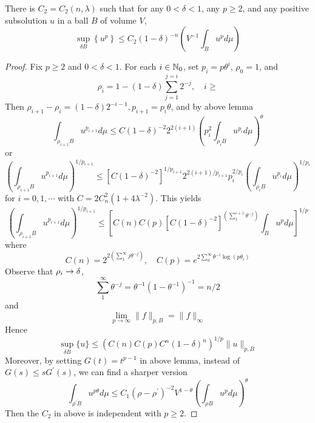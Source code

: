 \begin{enumerate}[label=\Roman*.]
	\begin{thm}
		There is $C_2 = C_2(n,\lambda)$ such that for any $0 < \delta < 1$, any $p \geq 2$, and any positive subsolution $u$ in a ball $B$ of volume $V$,
		\begin{equation*}
			\sup _{\delta B}\left\{u^p\right\} \leq C_2(1-\delta)^{-n}\left(V^{-1} \int_B u^p d \mu\right)
		\end{equation*}
	\end{thm}
	\begin{proof}
		Fix $p \geq 2$ and $0 < \delta < 1$. For each $i \in \mathbb{N}_0$, set $p_i = p\theta^i$, $\rho_0 = 1$, and
		\begin{equation*}
			\rho_i=1-(1-\delta) \sum_{j=1}^{j=i} 2^{-j}, \quad i \geq
		\end{equation*}
		Then $\rho_{i+1}-\rho_i=(1-\delta) 2^{-i-1}, p_{i+1}=p_i \theta$, and by above lemma
		\begin{equation*}
			\int_{\rho_{i+1} B} u^{p_{i+1}} d \mu \leq C(1-\delta)^{-2} 2^{2(i+1)}\left(p_i^2 \int_{\rho_i B} u^{p_i} d \mu\right)^\theta
		\end{equation*}
		or
		\begin{equation*}
			\left(\int_{\rho_{i+1} B} u^{p_{i+1}} d \mu\right)^{1 / p_{i+1}} \leq\left[C(1-\delta)^{-2}\right]^{1 / p_{i+1}} 2^{2(i+1) / p_{i+1}} p_i^{2 / p_i}\left(\int_{\rho_i B} u^{p_i} d \mu\right)^{1 / p_i}
		\end{equation*}
		for $i = 0,1,\cdots$ with $C = 2 C_n^2\left(1+4 \lambda^{-2}\right)$. This yields
		\begin{equation*}
			\left(\int_{\rho_{i+1} B} u^{p_{i+1}} d \mu\right)^{1 / p_{i+1}} \leq\left[C(n) C(p)\left[C(1-\delta)^{-2}\right]^{\left(\sum_1^{i+1} \theta^{-j}\right)} \int_B u^p d \mu\right]^{1 / p}
		\end{equation*}
		where
		\begin{equation*}
			C(n)=2^{2\left(\sum_1^{\infty} j \theta^{-j}\right)}, \quad C(p)=e^{2 \sum_0^{\infty} \theta^{-i} \log \left(p \theta_i\right)}
		\end{equation*}
		Observe that $\rho_i \rightarrow \delta$,
		\begin{equation*}
			\sum_1^{\infty} \theta^{-j}=\theta^{-1}\left(1-\theta^{-1}\right)^{-1}=n / 2
		\end{equation*}
		and 
		\begin{equation*}
			\lim _{p \rightarrow \infty}\|f\|_{p, B}=\|f\|_{\infty}
		\end{equation*}
		Hence
		\begin{equation*}
			\sup _{\delta B}\{u\} \leq\left(C(n) C(p) C^n(1-\delta)^n\right)^{1 / p}\|u\|_{p, B}
		\end{equation*}
		Moreover, by setting $G(t) = t^{p-1}$ in above lemma, instead of $G(s) \leq s G^{\prime}(s)$, we can find a sharper version
		\begin{equation*}
			\int_{\rho^{\prime} B} u^{p \theta} d \mu \leq C_1\left(\rho-\rho^{\prime}\right)^{-2} V^{1-\theta}\left(\int_{\rho B} u^p d \mu\right)^\theta
		\end{equation*}
		Then the $C_2$ in above is independent with $p \geq 2$.
	\end{proof}


\end{enumerate}
